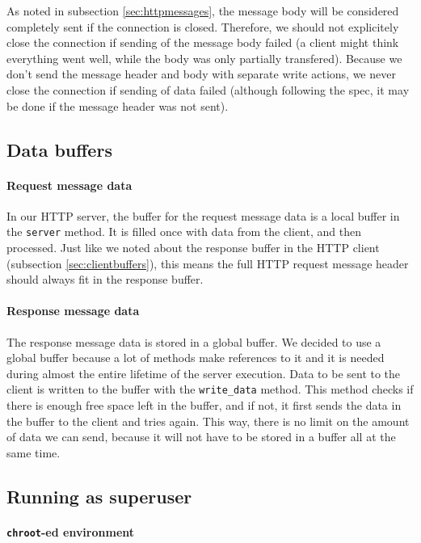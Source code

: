 \documentclass[11pt]{article}
\begin{document}
As noted in subsection \ref{sec:httpmessages}, the message body will be
considered completely sent if the connection is closed. Therefore, we should
not explicitely close the connection if sending of the message body
failed (a client might think everything went well, while the body was only
partially transfered). Because we don't send the message header and body with
separate write actions, we never close the connection if sending of data
failed (although following the spec, it may be done if the message header was
not sent).


\subsection{Data buffers}

\paragraph{Request message data}

In our HTTP server, the buffer for the request message data is a local buffer
in the \lstinline|server| method. It is filled once with data from the client,
and then processed. Just like we noted about the response buffer in the HTTP
client (subsection \ref{sec:clientbuffers}), this means the full HTTP request
message header should always fit in the response buffer.

\paragraph{Response message data}

The response message data is stored in a global buffer. We decided to use a
global buffer because a lot of methods make references to it and it is needed
during almost the entire lifetime of the server execution. Data to be sent to
the client is written to the buffer with the \lstinline|write_data|
method. This method checks if there is enough free space left in the buffer,
and if not, it first sends the data in the buffer to the client and tries
again. This way, there is no limit on the amount of data we can send, because
it will not have to be stored in a buffer all at the same time.


\subsection{Running as superuser}

\paragraph{\lstinline|chroot|-ed environment}
\end{document}
